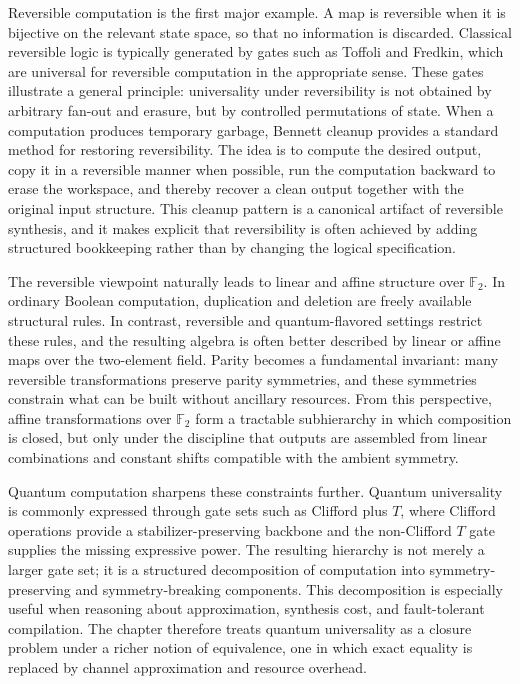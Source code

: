 \documentclass[11pt]{article}
\begin{document}
Reversible computation is the first major example. A map is reversible when it is bijective on the relevant state space, so that no information is discarded. Classical reversible logic is typically generated by gates such as Toffoli and Fredkin, which are universal for reversible computation in the appropriate sense. These gates illustrate a general principle: universality under reversibility is not obtained by arbitrary fan-out and erasure, but by controlled permutations of state. When a computation produces temporary garbage, Bennett cleanup provides a standard method for restoring reversibility. The idea is to compute the desired output, copy it in a reversible manner when possible, run the computation backward to erase the workspace, and thereby recover a clean output together with the original input structure. This cleanup pattern is a canonical artifact of reversible synthesis, and it makes explicit that reversibility is often achieved by adding structured bookkeeping rather than by changing the logical specification.

The reversible viewpoint naturally leads to linear and affine structure over \(\mathbb{F}_2\). In ordinary Boolean computation, duplication and deletion are freely available structural rules. In contrast, reversible and quantum-flavored settings restrict these rules, and the resulting algebra is often better described by linear or affine maps over the two-element field. Parity becomes a fundamental invariant: many reversible transformations preserve parity symmetries, and these symmetries constrain what can be built without ancillary resources. From this perspective, affine transformations over \(\mathbb{F}_2\) form a tractable subhierarchy in which composition is closed, but only under the discipline that outputs are assembled from linear combinations and constant shifts compatible with the ambient symmetry.

Quantum computation sharpens these constraints further. Quantum universality is commonly expressed through gate sets such as Clifford plus \(T\), where Clifford operations provide a stabilizer-preserving backbone and the non-Clifford \(T\) gate supplies the missing expressive power. The resulting hierarchy is not merely a larger gate set; it is a structured decomposition of computation into symmetry-preserving and symmetry-breaking components. This decomposition is especially useful when reasoning about approximation, synthesis cost, and fault-tolerant compilation. The chapter therefore treats quantum universality as a closure problem under a richer notion of equivalence, one in which exact equality is replaced by channel approximation and resource overhead.
\end{document}

